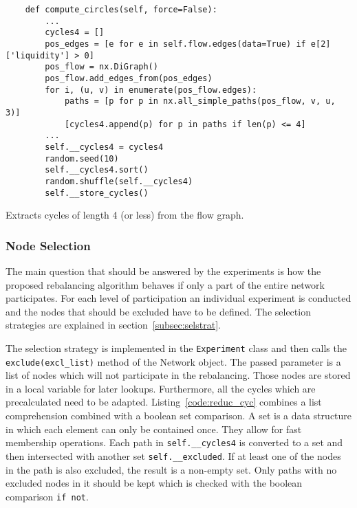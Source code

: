 \documentclass[final]{fhnwreport}       %
\begin{document}
\begin{listing}[H]
  \begin{verbatim}
    def compute_circles(self, force=False):
        ...
        cycles4 = []
        pos_edges = [e for e in self.flow.edges(data=True) if e[2]['liquidity'] > 0]
        pos_flow = nx.DiGraph()
        pos_flow.add_edges_from(pos_edges)
        for i, (u, v) in enumerate(pos_flow.edges):
            paths = [p for p in nx.all_simple_paths(pos_flow, v, u, 3)]
            [cycles4.append(p) for p in paths if len(p) <= 4]
        ...
        self.__cycles4 = cycles4
        random.seed(10)
        self.__cycles4.sort()
        random.shuffle(self.__cycles4)
        self.__store_cycles()
  \end{verbatim}
  \caption{Extracts cycles of length 4 (or less) from the flow graph.}
  \label{code:comp_circles}
\end{listing}

\subsubsection{Node Selection}
The main question that should be answered by the experiments is how the proposed rebalancing algorithm behaves if only a part of the entire network participates. For each level of participation an individual experiment is conducted and the nodes that should be excluded have to be defined. The selection strategies are explained in section~\ref{subsec:selstrat}.

The selection strategy is implemented in the \texttt{Experiment} class and then calls the \texttt{exclude(excl_list)} method of the Network object. The passed parameter is a list of nodes which will not participate in the rebalancing. Those nodes are stored in a local variable for later lookups. Furthermore, all the cycles which are precalculated need to be adapted. Listing~\ref{code:reduc_cyc} combines a list comprehension combined with a boolean set comparison. A set is a data structure in which each element can only be contained once. They allow for fast membership operations. Each path in \texttt{self.__cycles4} is converted to a set and then intersected with another set \texttt{self.__excluded}. If at least one of the nodes in the path is also excluded, the result is a non-empty set. Only paths with no excluded nodes in it should be kept which is checked with the boolean comparison \texttt{if not}.  
\end{document}
